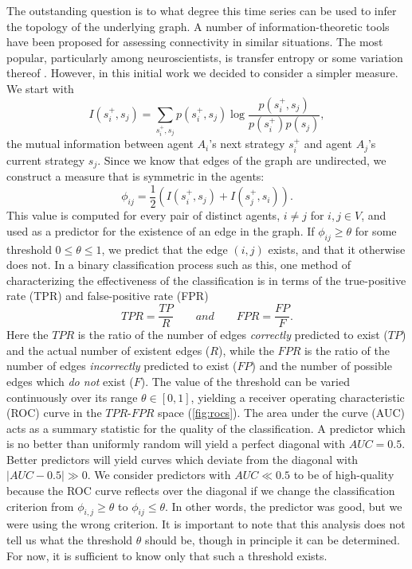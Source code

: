 \documentclass[letterpaper]{article}
\begin{document}
The outstanding question is to what degree this time series can be used to infer the topology of the underlying graph. A number of information-theoretic tools have been proposed for assessing connectivity in similar situations. The most popular, particularly among neuroscientists, is transfer entropy or some variation thereof \citep{Ito2011-yi, Vicente2011-mj, Orlandi2014-bh}. However, in this initial work we decided to consider a simpler measure. We start with
\begin{equation}
    I(s_i^+,s_j) = \sum_{s_i^+,s_j}p(s_i^+,s_j)\log{\frac{p(s_i^+,s_j)}{p(s_i^+)p(s_j)}},
\end{equation}
the mutual information between agent $A_i$'s next strategy $s_i^+$ and agent $A_j$'s current strategy $s_j$. Since we know that edges of the graph are undirected, we construct a measure that is symmetric in the agents:
\begin{equation}
    \phi_{ij} = \frac{1}{2}(I(s_i^+, s_j) + I(s_j^+,s_i)).
\end{equation}
This value is computed for every pair of distinct agents, $i \ne j$ for $i,j \in V$, and used as a predictor for the existence of an edge in the graph. If $\phi_{ij} \geq \theta$ for some threshold $0 \leq \theta \leq 1$, we predict that the edge $(i,j)$ exists, and that it otherwise does not. In a binary classification process such as this, one method of characterizing the effectiveness of the classification is in terms of the true-positive rate (TPR) and false-positive rate (FPR)
\begin{equation}
    TPR = \frac{TP}{R} \qquad and \qquad FPR = \frac{FP}{F}.
\end{equation}
Here the $TPR$ is the ratio of the number of edges \textit{correctly} predicted to exist ($TP$) and the actual number of existent edges ($R$), while the $FPR$ is the ratio of the number of edges \textit{incorrectly} predicted to exist ($FP$) and the number of possible edges which \textit{do not} exist ($F$). The value of the threshold can be varied continuously over its range $\theta \in [0,1]$, yielding a receiver operating characteristic (ROC) curve in the \mbox{$TPR$-$FPR$} space (\cref{fig:rocs}). The area under the curve (AUC) acts as a summary statistic for the quality of the classification. A predictor which is no better than uniformly random will yield a perfect diagonal with $AUC=0.5$. Better predictors will yield curves which deviate from the diagonal with $|AUC - 0.5| \gg 0$. We consider predictors with $AUC \ll 0.5$ to be of high-quality because the ROC curve reflects over the diagonal if we change the classification criterion from $\phi_{i,j} \geq \theta$ to $\phi_{ij} \leq \theta$. In other words, the predictor was good, but we were using the wrong criterion. It is important to note that this analysis does not tell us what the threshold $\theta$ should be, though in principle it can be determined. For now, it is sufficient to know only that such a threshold exists.
\end{document}
